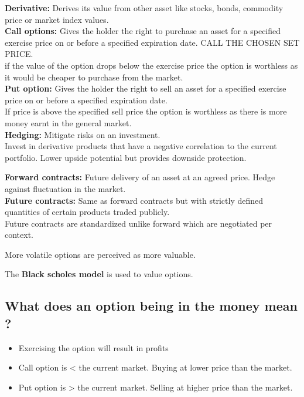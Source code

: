 \documentclass[11pt]{scrartcl} %
\begin{document}
\textbf{Derivative:} Derives its value from other asset like stocks, bonds, commodity price or market index values.\\
\textbf{Call options:} Gives the holder the right to purchase an asset for a specified exercise price on or before a specified expiration date. CALL THE CHOSEN SET PRICE.\\

if the value of the option drops below the exercise price the option is worthless as it would be cheaper to purchase from the market. \\

\textbf{Put option:} Gives the holder the right to sell an asset for a specified exercise price on or before a specified expiration date. \\

If price is above the specified sell price the option is worthless as there is more money earnt in the general market.\\

\textbf{Hedging:} Mitigate risks on an investment. \\

Invest in derivative products that have a negative correlation to the current portfolio.
Lower upside potential but provides downside protection.

\textbf{Forward contracts:} Future delivery of an asset at an agreed price. Hedge against fluctuation in the market.\\

\textbf{Future contracts:} Same as forward contracts but with strictly defined quantities of certain products traded publicly.\\

Future contracts are standardized unlike forward which are negotiated per context.

More volatile options are perceived as more valuable.

The \textbf{Black scholes model} is used to value options.

\subsection{What does an option being in the money mean ?}

\begin{itemize}
	\item Exercising the option will result in profits
	\item Call option is < the current market. Buying at lower price than the market.
	\item Put option is > the current market. Selling at higher price than the market.
\end{itemize}
\end{document}
